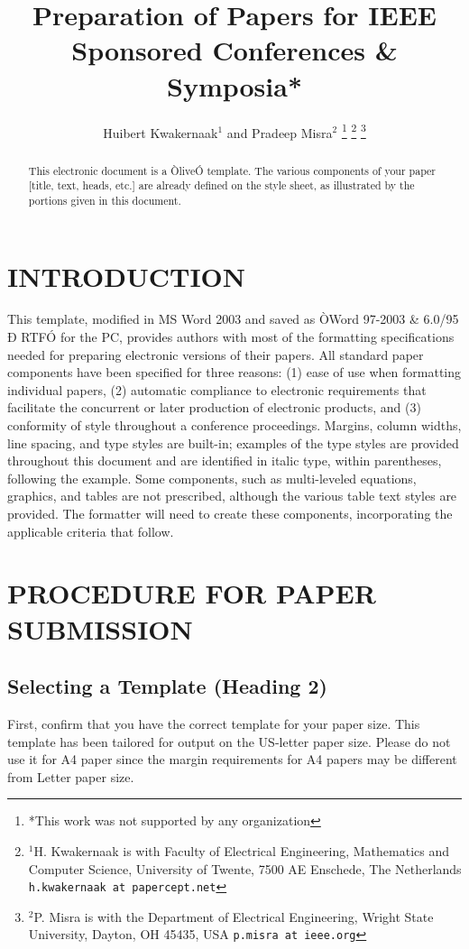 \documentclass[letterpaper, 10 pt, conference]{ieeeconf}  %
\title{\LARGE \bf
Preparation of Papers for IEEE Sponsored Conferences \& Symposia*
}
\author{Huibert Kwakernaak$^{1}$ and Pradeep Misra$^{2}$%
\thanks{*This work was not supported by any organization}%
\thanks{$^{1}$H. Kwakernaak is with Faculty of Electrical Engineering, Mathematics and Computer Science,
        University of Twente, 7500 AE Enschede, The Netherlands
        {\tt\small h.kwakernaak at papercept.net}}%
\thanks{$^{2}$P. Misra is with the Department of Electrical Engineering, Wright State University,
        Dayton, OH 45435, USA
        {\tt\small p.misra at ieee.org}}%
}
\begin{document}
\maketitle
\thispagestyle{empty}
\pagestyle{empty}


\begin{abstract}

This electronic document is a ÒliveÓ template. The various components of your paper [title, text, heads, etc.] are already defined on the style sheet, as illustrated by the portions given in this document.

\end{abstract}


\section{INTRODUCTION}

This template, modified in MS Word 2003 and saved as ÒWord 97-2003 \& 6.0/95 Ð RTFÓ for the PC, provides authors with most of the formatting specifications needed for preparing electronic versions of their papers. All standard paper components have been specified for three reasons: (1) ease of use when formatting individual papers, (2) automatic compliance to electronic requirements that facilitate the concurrent or later production of electronic products, and (3) conformity of style throughout a conference proceedings. Margins, column widths, line spacing, and type styles are built-in; examples of the type styles are provided throughout this document and are identified in italic type, within parentheses, following the example. Some components, such as multi-leveled equations, graphics, and tables are not prescribed, although the various table text styles are provided. The formatter will need to create these components, incorporating the applicable criteria that follow.

\section{PROCEDURE FOR PAPER SUBMISSION}

\subsection{Selecting a Template (Heading 2)}

First, confirm that you have the correct template for your paper size. This template has been tailored for output on the US-letter paper size. Please do not use it for A4 paper since the margin requirements for A4 papers may be different from Letter paper size.
\end{document}

